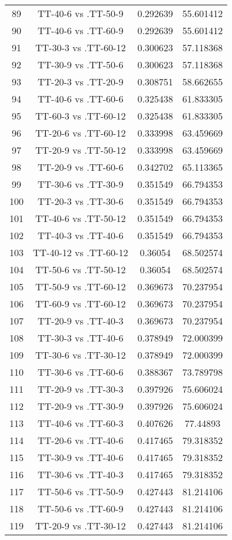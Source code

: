 \documentclass[a4paper,10pt]{article}
\begin{document}
\begin{landscape}
\begin{table}[!htp]
\begin{tabular}{cccc}
89&TT-40-6 vs .TT-50-9&0.292639&55.601412\\
90&TT-40-6 vs .TT-60-9&0.292639&55.601412\\
91&TT-30-3 vs .TT-60-12&0.300623&57.118368\\
92&TT-30-9 vs .TT-50-6&0.300623&57.118368\\
93&TT-20-3 vs .TT-20-9&0.308751&58.662655\\
94&TT-40-6 vs .TT-60-6&0.325438&61.833305\\
95&TT-60-3 vs .TT-60-12&0.325438&61.833305\\
96&TT-20-6 vs .TT-60-12&0.333998&63.459669\\
97&TT-20-9 vs .TT-50-12&0.333998&63.459669\\
98&TT-20-9 vs .TT-60-6&0.342702&65.113365\\
99&TT-30-6 vs .TT-30-9&0.351549&66.794353\\
100&TT-20-3 vs .TT-30-6&0.351549&66.794353\\
101&TT-40-6 vs .TT-50-12&0.351549&66.794353\\
102&TT-40-3 vs .TT-40-6&0.351549&66.794353\\
103&TT-40-12 vs .TT-60-12&0.36054&68.502574\\
104&TT-50-6 vs .TT-50-12&0.36054&68.502574\\
105&TT-50-9 vs .TT-60-12&0.369673&70.237954\\
106&TT-60-9 vs .TT-60-12&0.369673&70.237954\\
107&TT-20-9 vs .TT-40-3&0.369673&70.237954\\
108&TT-30-3 vs .TT-40-6&0.378949&72.000399\\
109&TT-30-6 vs .TT-30-12&0.378949&72.000399\\
110&TT-30-6 vs .TT-60-6&0.388367&73.789798\\
111&TT-20-9 vs .TT-30-3&0.397926&75.606024\\
112&TT-20-9 vs .TT-30-9&0.397926&75.606024\\
113&TT-40-6 vs .TT-60-3&0.407626&77.44893\\
114&TT-20-6 vs .TT-40-6&0.417465&79.318352\\
115&TT-30-9 vs .TT-40-6&0.417465&79.318352\\
116&TT-30-6 vs .TT-40-3&0.417465&79.318352\\
117&TT-50-6 vs .TT-50-9&0.427443&81.214106\\
118&TT-50-6 vs .TT-60-9&0.427443&81.214106\\
119&TT-20-9 vs .TT-30-12&0.427443&81.214106\\

\end{tabular}
\end{table}
\end{landscape}
\end{document}
